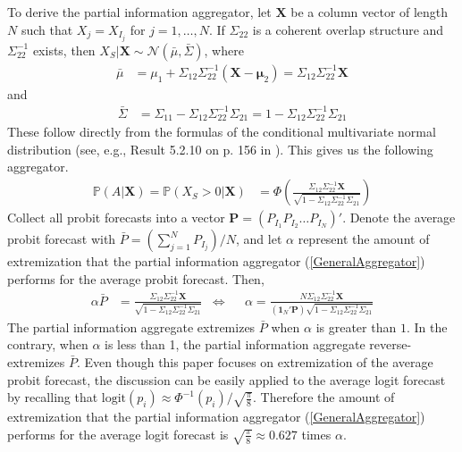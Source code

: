 \documentclass[11pt,twoside]{article}
\renewcommand{\P}{\mathbb{P}}
\theoremstyle{definition}
\theoremstyle{definition}
\begin{document}
To derive the partial information aggregator, let $\boldsymbol{X}$ be a column vector of length $N$ such that $X_j = X_{I_j}$ for $j = 1, \dots, N$. If $\Sigma_{22}$ is a coherent overlap structure and $\Sigma_{22}^{-1}$ exists, then $X_{S} | \boldsymbol{X} \sim \mathcal{N}(\bar{\mu}, \bar{\Sigma})$, where
\begin{align}
\bar{\mu} &= \mu_1 + \Sigma_{12} \Sigma_{22}^{-1} (\boldsymbol{X} - \boldsymbol{\mu}_2) =  \Sigma_{12} \Sigma_{22}^{-1} \boldsymbol{X} \label{condMu}
\end{align}
and
\begin{align}
 \bar{\Sigma}&= \Sigma_{11} - \Sigma_{12} \Sigma_{22}^{-1} \Sigma_{21} =1 - \Sigma_{12} \Sigma_{22}^{-1} \Sigma_{21}  \label{condSigma}
\end{align}
These follow directly from the formulas of the conditional multivariate normal distribution (see, e.g., Result 5.2.10 on p. 156 in \cite{ravishanker2001first}). This gives us the following aggregator. 
\begin{align}
\P\left(A  | \boldsymbol{X}\right)  = \P\left(X_{S} > 0 | \boldsymbol{X}\right) &= \Phi\left( \frac{\Sigma_{12} \Sigma_{22}^{-1} \boldsymbol{X}}{\sqrt{1 - \Sigma_{12} \Sigma_{22}^{-1} \Sigma_{21}}}\right) \label{GeneralAggregator}
\end{align}
Collect all probit forecasts into a vector $\boldsymbol{P} = (P_{I_1} P_{I_2} \dots P_{I_N})'$. Denote the average probit forecast with $\bar{P} = \left( \sum_{j=1}^N P_{I_j} \right)/N$, and let $\alpha$ represent the amount of extremization that the partial information aggregator (\ref{GeneralAggregator}) performs for the average probit forecast. Then,
\begin{align}
\alpha \bar{P}&=  \frac{\Sigma_{12} \Sigma_{22}^{-1} \boldsymbol{X}}{\sqrt{1 - \Sigma_{12} \Sigma_{22}^{-1} \Sigma_{21}}}  &\Leftrightarrow&& \alpha  = \frac{N \Sigma_{12} \Sigma_{22}^{-1} \boldsymbol{X}}{\left(\boldsymbol{1}_N' \boldsymbol{P} \right) \sqrt{1 - \Sigma_{12} \Sigma_{22}^{-1} \Sigma_{21}}} \label{alpha}
\end{align}
The partial information aggregate extremizes $\bar{P}$ when $\alpha$ is greater than $1$. In the contrary, when $\alpha$ is less than 1, the partial information aggregate reverse-extremizes $\bar{P}$. Even though this paper focuses on extremization of the average probit forecast, the discussion can be easily applied to the average logit forecast by recalling that $\text{logit}(p_i) \approx \Phi^{-1}(p_i)/\sqrt{\frac{\pi}{8}}$. Therefore the amount of extremization that the partial information aggregator (\ref{GeneralAggregator}) performs for the average logit forecast is $\sqrt{\frac{\pi}{8}} \approx 0.627$ times $\alpha$.  
\end{document}
